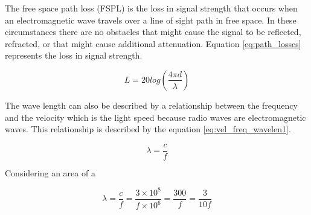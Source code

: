 The free space path loss (FSPL) is the loss in signal strength that occurs when an electromagnetic wave travels over a line of sight path in free space. In these circumstances there are no obstacles that might cause the signal to be reflected, refracted, or that might cause additional attenuation. Equation \ref{eq:path_losses} represents the loss in signal strength.

\begin{equation}\label{eq:path_losses}
L = 20log\left (\frac{4\pi d}{\lambda} \right)
\end{equation}

The wave length can also be described by a relationship between the frequency and the velocity which is the light speed because radio waves are electromagnetic waves. This relationship is described by the equation \ref{eq:vel_freq_wavelen1}.

\begin{equation}\label{eq:vel_freq_wavelen1}
\lambda = \frac{c}{f}
\end{equation}

Considering an area of a 

\begin{equation}\label{eq:vel_freq_wavelen2}
\lambda = \frac{c}{f} = \frac{3\times 10^{8}}{f\times 10^{6}}=\frac{300}{f}=\frac{3}{10f}
\end{equation}